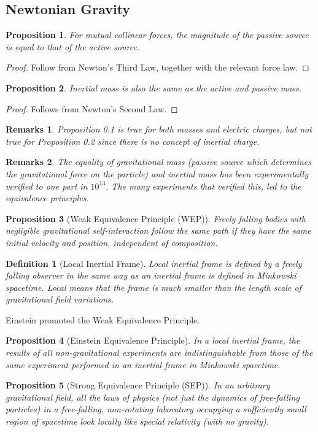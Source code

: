 \documentclass[a4paper]{article}
\newtheorem{defi}{Definition}[section]
\newtheorem{remarks}{Remarks}[section]
\newtheorem{prop}{Proposition}[section]
\theoremstyle{new}
\begin{document}
\subsection{Newtonian Gravity}
\begin{prop}
For mutual collinear forces, the magnitude of the passive source is equal to that of the active source.
\end{prop}
\begin{proof}
Follow from Newton's Third Law, together with the relevant force law.
\end{proof}
\begin{prop}
Inertial mass is also the same as the active and passive mass.
\end{prop}
\begin{proof}
Follows from Newton's Second Law. 
\end{proof}
\begin{remarks}
Proposition 0.1 is true for both masses and electric charges, but not true for Proposition 0.2 since there is no concept of inertial charge.
\end{remarks}
\begin{remarks}
The equality of gravitational mass (passive source which determines the gravitational force on the particle) and inertial mass has been experimentally verified to one part in $10^{13}$. The many experiments that verified this, led to the equivalence principles.
\end{remarks}
\begin{prop}[Weak Equivalence Principle (WEP)]
Freely falling bodies with negligible gravitational self-interaction follow the same path if they have the same initial velocity and position, independent of composition.
\end{prop}
\begin{defi}[Local Inertial Frame]
Local inertial frame is defined by a freely falling observer in the same way as an inertial frame is defined in Minkowski spacetime. Local means that the frame is much smaller than the length scale of gravitational field variations. 
\end{defi}
Einstein promoted the Weak Equivalence Principle.
\begin{prop}[Einstein Equivalence Principle]
In a local inertial frame, the results of all non-gravitational experiments are indistinguishable from those of the same experiment performed in an inertial frame in Minkowski spacetime.
\end{prop}
\begin{prop}[Strong Equivalence Principle (SEP)]
In an arbitrary gravitational field, all the laws of physics (not just the dynamics of free-falling particles) in a free-falling, non-rotating laboratory occupying a
sufficiently small region of spacetime look locally like
special relativity (with no gravity).
\end{prop}
\end{document}
